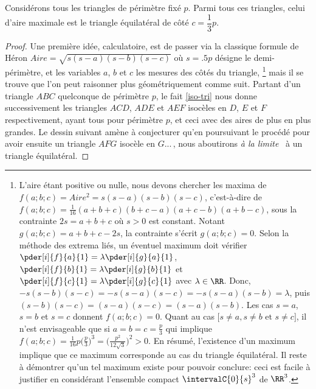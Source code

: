 \begin{fact}\label{iso-tri}
	Considérons tous les triangles de périmètre fixé $p$. Parmi tous ces triangles, celui d'aire maximale est le triangle équilatéral de côté $c = \dfrac13 p$.
\end{fact}


\begin{proof}
	Une première idée, calculatoire, est de passer via la classique formule de Héron $Aire = \sqrt{s(s - a)(s - b)(s - c)}$ où $s = \num{.5} p$ désigne le demi-périmètre, et les variables $a$, $b$ et $c$ les mesures des côtés du triangle,%
	\footnote{
		L'aire étant positive ou nulle, nous devons chercher les maxima de $f(a;b;c) = Aire^2 = s(s - a)(s - b)(s - c)$, c'est-à-dire de $f(a;b;c) = \frac{1}{16} (a + b + c)(b + c - a)(a + c - b)(a + b - c)$, sous la contrainte $2s = a + b + c$ où $s > 0$ est constant.
		Notant $g(a;b;c) = a + b + c - 2 s$, la contrainte s'écrit $g(a;b;c) = 0$.
		Selon la méthode des extrema liés, un éventuel maximum doit vérifier 
		$\pder[i]{f}{a}{1} = \lambda \pder[i]{g}{a}{1}$,
		$\pder[i]{f}{b}{1} = \lambda \pder[i]{g}{b}{1}$ et
		$\pder[i]{f}{c}{1} = \lambda \pder[i]{g}{c}{1}$
		avec $\lambda \in \RR$.
		Donc,
		$- s(s - b)(s - c) = - s(s - a)(s - c) = - s(s - a)(s - b) = \lambda$,
		puis
		$(s - b)(s - c) = (s - a)(s - c) = (s - a)(s - b)$.
		Les cas $s = a$, $s = b$ et $s = c$ donnent $f(a;b;c) = 0$.
		Quant au cas $\big[ s \neq a, s \neq b \text{ et } s \neq c \big]$, il n'est envisageable que si $a = b = c = \frac{p}{3}$ qui implique $f(a;b;c) = \frac{1}{16} p \big( \frac{p}{3} \big)^3 = \big( \frac{p^2}{12 \sqrt{3}} \big)^2 > 0$.
		En résumé, l'existence d'un maximum implique que ce maximum corresponde au cas du triangle équilatéral.
		Il reste à démontrer qu'un tel maximum existe pour pouvoir conclure: ceci est facile à justifier en considérant l'ensemble compact $\intervalC{0}{s}^3$ de $\RR^3$. 
	}
	mais il se trouve que l'on peut raisonner plus géométriquement comme suit.
	Partant d'un triangle $ABC$ quelconque de périmètre $p$, le fait \ref{iso-tri} nous donne successivement les triangles $ACD$, $ADE$ et $AEF$ isocèles en $D$, $E$ et $F$ respectivement, ayant tous pour périmètre $p$, et ceci avec des aires de plus en plus grandes.  
	Le dessin suivant amène à conjecturer qu'en poursuivant le procédé pour avoir ensuite un triangle $AFG$ isocèle en $G$...\,, nous aboutirons \og \emph{à la limite} \fg\ à un triangle équilatéral.


\end{proof}
